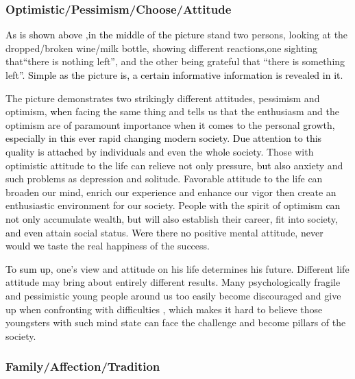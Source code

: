 \documentclass{article}
\begin{document}
\subsubsection{Optimistic/Pessimism/Choose/Attitude}
\label{sec:optimistic}

\hspace{0.4cm} \textcolor{black}{As is shown above ,in the middle of the picture} stand two persons,
looking at the dropped/broken wine/milk bottle, showing different reactions,one sighting
that“there is nothing left”, and the other being grateful that “there is something
left”. \textcolor{black}{Simple as the picture is, a certain informative information is
  revealed in it}. 

\par {The picture demonstrates two strikingly different attitudes}, pessimism and
optimism, \textcolor{black}{when} facing the same thing and tells us that the enthusiasm and
the optimism are of paramount importance when it comes to the personal growth,
\textcolor{black}{especially in this ever rapid changing modern society}. \textcolor{black}{Due
  attention to this quality is attached by individuals and even the whole society}. Those
with optimistic attitude to the life can relieve not only pressure, \textcolor{black}{but
  also} anxiety and such problems as depression and solitude. Favorable attitude to the
life can broaden our mind, enrich our experience and enhance our vigor then create an
enthusiastic environment for our society. People with the spirit of optimism
\textcolor{black}{can not only} accumulate wealth, \textcolor{black}{but will also} establish
their career, fit into society, \textcolor{black}{and even} attain social
status. \textcolor{black}{Were there no} positive mental attitude, \textcolor{black}{never
  would we} taste the real happiness of the success.

\par \textcolor{black}{To sum up}, one’s view and attitude on his life determines his
future. Different life attitude may bring about entirely different results. Many
psychologically fragile and pessimistic young people around us too easily become
discouraged and give up when confronting with difficulties , which makes it hard to
believe those youngsters with such mind state can face the challenge and become pillars of
the society.

\subsubsection{Family/Affection/Tradition}
\label{sec:familyaffection}
\end{document}
